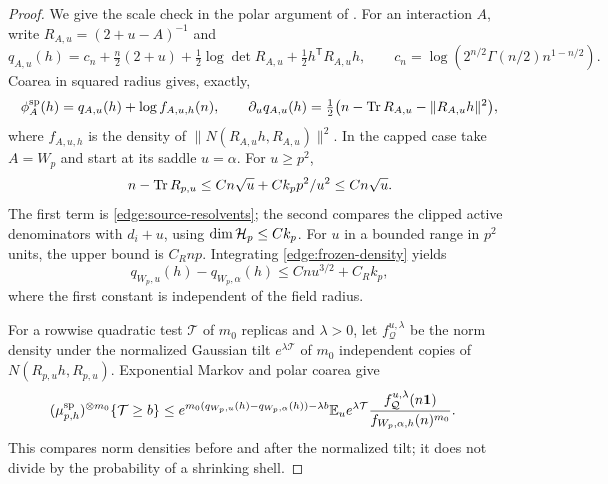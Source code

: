\begin{proof}
We give the scale check in the polar argument of
\cite[Section~15.3, Equations~(15.5)--(15.8)]{CM}.
For an interaction \(A\), write \(R_{A,u}=(2+u-A)^{-1}\) and
\[
 q_{A,u}(h)=c_n+\tfrac n2(2+u)+\tfrac12\log\det R_{A,u}
                      +\tfrac12h^{\mathsf T}R_{A,u}h,\qquad
 c_n=\log\!\left(2^{n/2}\Gamma(n/2)n^{1-n/2}\right).
\]
Coarea in squared radius gives, exactly,
\begin{equation}\label{edge:frozen-density}
 \phi_A^{\rm sp}(h)=q_{A,u}(h)+\log f_{A,u,h}(n),\qquad
 \partial_uq_{A,u}(h)
   =\tfrac12\bigl(n-\operatorname{Tr} R_{A,u}-\|R_{A,u}h\|^2\bigr),
\end{equation}
where \(f_{A,u,h}\) is the density of
\(\|N(R_{A,u}h,R_{A,u})\|^2\).  In the capped case take \(A=W_p\)
and start at its saddle \(u=\alpha\).  For \(u\ge p^2\),
\[
 n-\operatorname{Tr} R_{p,u}
 \le Cn\sqrt u+Ck_pp^2/u^2\le Cn\sqrt u.
\]
The first term is \eqref{edge:source-resolvents}; the second compares
the clipped active denominators with \(d_i+u\), using
\(\dim\mathcal H_p\le Ck_p\).  For \(u\) in a bounded range in \(p^2\) units,
the upper bound is \(C_Rnp\).  Integrating
\eqref{edge:frozen-density} yields
\begin{equation}\label{edge:frozen-normalizer-cost}
 q_{W_p,u}(h)-q_{W_p,\alpha}(h)\le Cnu^{3/2}+C_Rk_p,
\end{equation}
where the first constant is independent of the field radius.

For a rowwise quadratic test \(\mathcal T\) of \(m_0\) replicas and
\(\lambda>0\), let \(f_{\mathcal Q}^{u,\lambda}\) be the norm density
under the normalized Gaussian tilt \(e^{\lambda\mathcal T}\) of
\(m_0\) independent copies of \(N(R_{p,u}h,R_{p,u})\).  Exponential
Markov and polar coarea give
\begin{equation}\label{edge:polar-tail}
 \begin{split}
 (\mu_{p,h}^{\rm sp})^{\otimes m_0}\{\mathcal T\ge b\}
 \le{}&
 e^{m_0(q_{W_p,u}(h)-q_{W_p,\alpha}(h))-\lambda b}
 \mathbb E_u e^{\lambda\mathcal T}
 \frac{f_{\mathcal Q}^{u,\lambda}(n\mathbf1)}
      {f_{W_p,\alpha,h}(n)^{m_0}} .
 \end{split}
\end{equation}
This compares norm densities before and after the normalized tilt; it
does not divide by the probability of a shrinking shell.


\end{proof}
